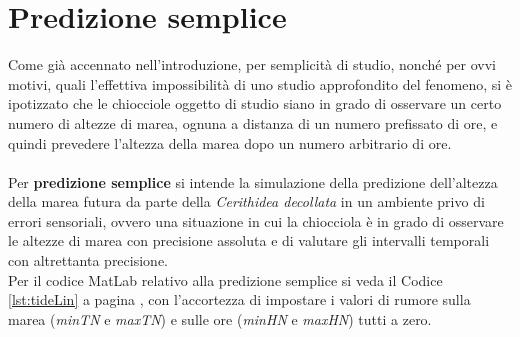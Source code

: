 \chapter{Predizione semplice}
	Come già accennato nell'introduzione, per semplicità di studio, nonché per ovvi motivi, quali l'effettiva impossibilità di uno studio approfondito del fenomeno, si è ipotizzato che le chiocciole oggetto di studio siano in grado di osservare un certo numero di altezze di marea, ognuna a distanza di un numero prefissato di ore, e quindi prevedere l'altezza della marea dopo un numero arbitrario di ore.\\
	\\
	Per \textbf{predizione semplice} si intende la simulazione della predizione dell'altezza della marea futura da parte della \textit{Cerithidea decollata} in un ambiente privo di errori sensoriali, ovvero una situazione in cui la chiocciola è in grado di osservare le altezze di marea con precisione assoluta e di valutare gli intervalli temporali con altrettanta precisione.\\
	Per il codice MatLab relativo alla predizione semplice si veda il Codice \ref{lst:tideLin} a pagina \pageref{lst:tideLin}, con l'accortezza di impostare i valori di rumore sulla marea (\textit{minTN} e \textit{maxTN}) e sulle ore (\textit{minHN} e \textit{maxHN}) tutti a zero.
